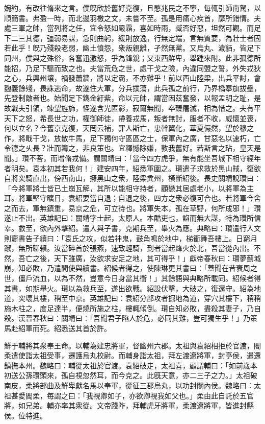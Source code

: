 \begin{pinyinscope}
婉約，有改往脩來之言。僕旣欣於舊好克復，且愍兆民之不寧，每輒引師南駕，以順簡書。弗盈一時，而北邊羽檄之文，未嘗不至。孤是用痛心疾首，靡所錯情。夫處三軍之帥，當列將之任，宜令怒如嚴霜，喜如時雨，臧否好惡，坦然可觀。而足下二三其德，彊弱易謀，急則曲躬，緩則放逸，行無定端，言無質要，為壯士者固若此乎！旣乃殘殺老弱，幽土憤怨，衆叛親離，孑然無黨。又烏丸、濊貊，皆足下同州，僕與之殊俗，各奮迅激怒，爭為鋒銳；又東西鮮卑，舉踵來附。此非孤德所能招，乃足下驅而致之也。夫當荒危之世，處干戈之險，內違同盟之誓，外失戎狄之心，兵興州壤，禍發蕭牆，將以定霸，不亦難乎！前以西山陸梁，出兵平討，會麴義餘殘，畏誅逃命，故遂住大軍，分兵撲蕩，此兵孤之前行，乃界橋搴旗拔壘，先登制敵者也。始聞足下鐫金紆紫，命以元帥，謂當因茲奮發，以報孟明之耻，是故戰夫引領，竦望旌斾，怪遂含光匿影，寂爾無聞，卒臻屠滅，相為惜之。夫有平天下之怒，希長世之功，權御師徒，帶養戎馬，叛者無討，服者不收，威懷並喪，何以立名？今舊京克復，天罔云補，罪人斯亡，忠幹翼化，華夏儼然，望於穆之作，將戢干戈，放散牛馬，足下獨何守區區之士，保軍內之廣，甘惡名以速朽，亡令德之乆長？壯而籌之，非良策也。宜釋憾除嫌，敦我舊好。若斯言之玷，皇天是聞。」瓚不荅，而增脩戎備。謂關靖曰：「當今四方虎爭，無有能坐吾城下相守經年者明矣。袁本初其若我何！」建安四年，紹悉軍圍之。瓚遣子求救於黑山賊，復欲自將突騎直出，傍西南山，擁黑山之衆，陸梁兾州，橫斷紹後。長史關靖說瓚曰：「今將軍將士皆已土崩瓦解，其所以能相守持者，顧戀其居處老小，以將軍為主耳。將軍堅守曠日，袁紹要當自退；自退之後，四方之衆必復可合也。若將軍今舍之而去，軍無鎮重，易京之危，可立待也。將軍失本，孤在草野，何所成邪！」瓚遂止不出。英雄記曰：關靖字士起，太原人。本酷吏也，諂而無大謀，特為瓚所信幸。救至，欲內外擊紹。遣人與子書，克期兵至，舉火為應。典略曰：瓚遣行人文則齎書告子續曰：「袁氏之攻，似若神鬼，鼓角鳴於地中，梯衝舞吾樓上。日窮月踧，無所聊賴。汝當碎首於張燕，速致輕騎，到者當起烽火於北，吾當從內出。不然，吾亡之後，天下雖廣，汝欲求安足之地，其可得乎！」獻帝春秋曰：瓚夢薊城崩，知必敗，乃遣間使與續書。紹候者得之，使陳琳更其書曰：「蓋聞在昔衰周之世，僵戶流血，以為不然，豈意今日身當其衝！」其餘語與典略所載同。紹候者得其書，如期舉火。瓚以為救兵至，遂出欲戰。紹設伏擊，大破之，復還守。紹為地道，突壞其樓，稍至中京。英雄記曰：袁紹分部攻者掘地為道，穿穴其樓下，稍稍施木柱之，度足達半，便燒所施之柱，樓輒傾倒。瓚自知必敗，盡殺其妻子，乃自殺。漢晉春秋曰：關靖曰：「吾聞君子陷人於危，必同其難，豈可獨生乎！」乃策馬赴紹軍而死。紹悉送其首於許。

鮮于輔將其衆奉王命。以輔為建忠將軍，督幽州六郡。太祖與袁紹相拒於官渡，閻柔遣使詣太祖受事，遷護烏丸校尉。而輔身詣太祖，拜左渡遼將軍，封亭侯，遣還鎮撫本州。魏略曰：輔從太祖於官渡。袁紹破走，太祖喜，顧謂輔曰：「如前歲本初送公孫瓚頭來，孤自視忽然耳，而今克之。此旣天意，亦二三子之力。」太祖破南皮，柔將部曲及鮮卑獻名馬以奉軍，從征三郡烏丸，以功封關內侯。魏略曰：太祖甚愛閻柔，每謂之曰：「我視卿如子，亦欲卿視我如父也。」柔由此自託於五官將，如兄弟。輔亦率其衆從。文帝踐阼，拜輔虎牙將軍，柔渡遼將軍，皆進封縣侯。位特進。


\end{pinyinscope}